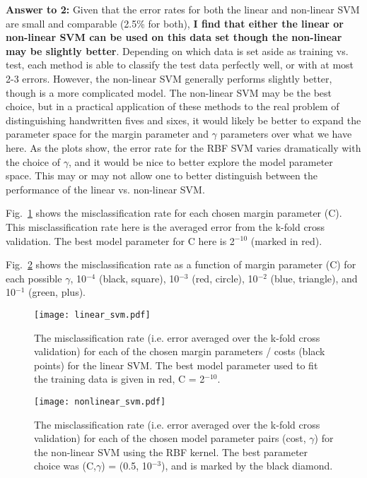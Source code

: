 \documentclass[12pt]{article}%
\begin{document}
\textbf{Answer to 2:} Given that the error rates for both the linear and non-linear SVM are small and comparable (2.5\% for both), \textbf{I find that either the linear or non-linear SVM can be used on this data set though the non-linear may be slightly better}. Depending on which data is set aside as training vs. test, each method is able to classify the test data perfectly well, or with at most 2-3 errors. However, the non-linear SVM generally performs slightly better, though is a more complicated model. The non-linear SVM may be the best choice, but in a practical application of these methods to the real problem of distinguishing handwritten fives and sixes, it would likely be better to expand the parameter space for the margin parameter and $\gamma$ parameters over what we have here. As the plots show, the error rate for the RBF SVM varies dramatically with the choice of $\gamma$, and it would be nice to better explore the model parameter space. This may or may not allow one to better distinguish between the performance of the linear vs. non-linear SVM.

Fig.~\ref{fig:linear svm} shows the misclassification rate for each chosen margin parameter (C). This misclassification rate here is the averaged error from the k-fold cross validation. The best model parameter for C here is 2$^{-10}$ (marked in red).

Fig.~\ref{fig:nonlinear svm} shows the misclassification rate as a function of margin parameter (C) for each possible $\gamma$, 10$^{-4}$ (black, square), 10$^{-3}$ (red, circle), 10$^{-2}$ (blue, triangle), and 10$^{-1}$ (green, plus). 

\begin{figure}[tb]
\center
\texttt{[image: linear\_svm.pdf]}
\caption{The misclassification rate (i.e. error averaged over the k-fold cross validation) for each of the chosen margin parameters / costs (black points) for the linear SVM. The best model parameter used to fit the training data is given in red, C = 2$^{-10}$.}
\label{fig:linear svm}
\end{figure}

\begin{figure}[tb]
\center
\texttt{[image: nonlinear\_svm.pdf]}
\caption{The misclassification rate (i.e. error averaged over the k-fold cross validation) for each of the chosen model parameter pairs (cost, $\gamma$) for the non-linear SVM using the RBF kernel. The best parameter choice was (C,$\gamma$) = (0.5, 10$^{-3}$), and is marked by the black diamond.}
\label{fig:nonlinear svm}
\end{figure}
\end{document}
